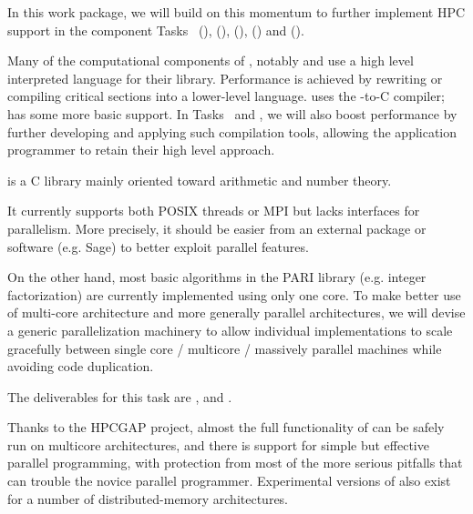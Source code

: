 \begin{workpackage}
\begin{wpdescription}
  In this work package, we will build on this momentum to further implement HPC support in
  the component Tasks~ (\Pari), (\GAP),
   (\Linbox), (\MPIR) and
   (\Singular).
  
  Many of the computational components of \TheProject, notably \Sage
  and \GAP use a high level
  interpreted language for their library. Performance is achieved by
  rewriting or compiling critical sections into a lower-level
  language. \Sage uses
  the \Cython \Python-to-C compiler; \GAP has some more basic support.
  In Tasks~ and , we will also boost performance by
  further developing and applying such compilation tools, allowing the
  application programmer to retain their high level approach.

\end{wpdescription}
\begin{tasklist}
\begin{task}[title=PARI,id=hpc-pari,PM=20, lead=UB,wphases=0-48!0.5]
  \Pari is a C library mainly oriented toward arithmetic and number theory.
  
  It currently supports both POSIX threads or MPI but lacks interfaces for
  parallelism. More precisely, it should be easier from an external package
  or software (e.g. Sage) to better exploit \Pari parallel features.

  On the other hand, most basic algorithms in the PARI library (e.g. integer
  factorization) are currently implemented using only one core. To
  make better use of multi-core architecture and more generally parallel
  architectures, we will devise a generic parallelization machinery
  to allow individual implementations to scale gracefully between single
  core / multicore / massively parallel machines while avoiding code
  duplication.

  The deliverables for this task are ,
   and .
\end{task}


\begin{task}[title=GAP,id=hpc-gap,PM=18, lead=SA, wphases={0-48!0.375}]
  Thanks to the HPCGAP project, almost the full functionality of \GAP
  can be safely run on multicore architectures, and there is support for
  simple but effective parallel programming, with protection from most
  of the more serious pitfalls that can trouble the novice parallel
  programmer. Experimental versions of \GAP also exist for a number of
  distributed-memory architectures.



\end{task}
\end{tasklist}
\end{workpackage}
